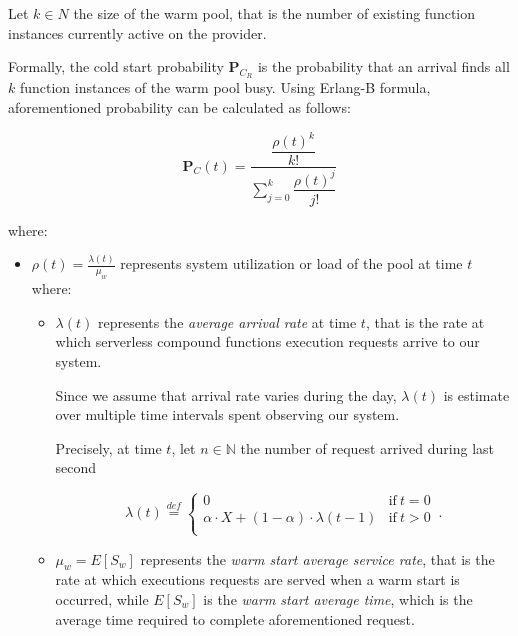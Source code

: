 \documentclass[10pt,a4paper]{report}
\newcommand*{\N}{\mathbb{N}}
\newcommand{\mathDef}{\overset{\textit{def}}{=}}
\theoremstyle{definition}
\begin{document}
Let $k \in N$ the size of the warm pool, that is the number of existing function instances currently active on the provider.

Formally, the cold start probability $\textbf{P}_{C_R}$ is the probability that an arrival finds all $k$ function instances of the warm pool busy. Using Erlang-B formula, aforementioned probability can be calculated as follows:

\begin{equation}
	\displaystyle \textbf{P}_{C}(t) = \dfrac{\dfrac{\rho(t)^k}{k!}}{\displaystyle\sum_{j=0}^k \dfrac{\rho(t)^j}{j!}}
\end{equation}

where:

\begin{itemize}
	
	\item $\displaystyle \rho(t) = \frac{\lambda(t)}{\mu_{w}}$ represents system utilization or load of the pool at time $t$ where:
	
	\begin{itemize}
		
		\item $\lambda(t)$ represents the \textit{average arrival rate} at time $t$, that is the  rate at which serverless compound functions execution requests arrive to our system.
		
		Since we assume that arrival rate varies during the day, $\lambda(t)$ is estimate over multiple time intervals spent observing our system.
		
		Precisely, at time $t$, let $n \in \N$ the number of request arrived during last second 
		
		\begin{equation}
			\lambda(t) \mathDef
			\begin{cases}
				0 & \text{if}\ t = 0\\ 
				\alpha \cdot X + (1 - \alpha) \cdot \lambda(t-1) & \text{if}\ t > 0\\
				
			\end{cases}\,.
		\end{equation}
		
		\item $\mu_{w} = E[S_w]$ represents the \textit{warm start average service rate}, that is the rate at which executions requests are served when a warm start is occurred, while $E[S_w]$ is the \textit{warm start average time}, which is the average time required to complete aforementioned request.
		
	\end{itemize}
	
\end{itemize}
\end{document}
